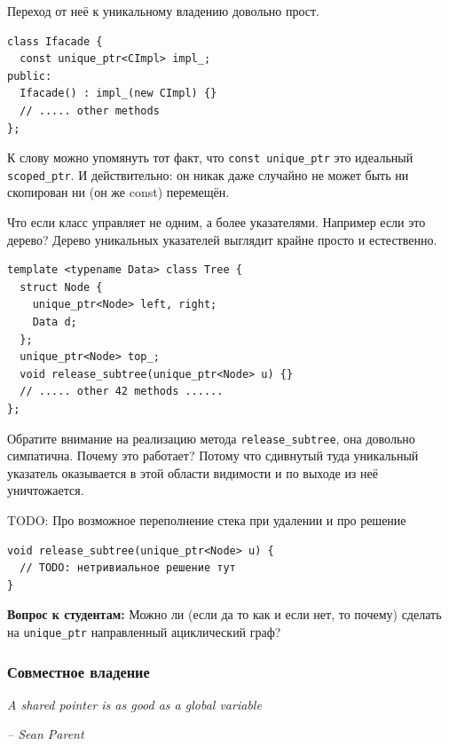 \documentclass[a4paper,12pt,oneside]{article}
\newif\ifanswers
\begin{document}
\ifanswers
Правильный ответ: например чтобы не забыть его инициализировать и чтобы заблокировать всякие копирующие и прочие конструкторы по умолчанию
\fi

Переход от неё к уникальному владению довольно прост.

\begin{lstlisting}
class Ifacade {
  const unique_ptr<CImpl> impl_;
public:
  Ifacade() : impl_(new CImpl) {}
  // ..... other methods
};
\end{lstlisting}

К слову можно упомянуть тот факт, что \lstinline!const unique_ptr! это идеальный \lstinline!scoped_ptr!. И действительно: он никак даже случайно не может быть ни скопирован ни (он же const) перемещён.

Что если класс управляет не одним, а более указателями. Например если это дерево? Дерево уникальных указателей выглядит крайне просто и естественно.

\begin{lstlisting}
template <typename Data> class Tree {
  struct Node {
    unique_ptr<Node> left, right;
    Data d;
  };
  unique_ptr<Node> top_;
  void release_subtree(unique_ptr<Node> u) {}
  // ..... other 42 methods ......
};
\end{lstlisting}

Обратите внимание на реализацию метода \lstinline!release_subtree!, она довольно симпатична. Почему это работает? Потому что сдивнутый туда уникальный указатель оказывается в этой области видимости и по выходе из неё уничтожается.

TODO: Про возможное переполнение стека при удалении и про решение

\begin{lstlisting}
void release_subtree(unique_ptr<Node> u) {
  // TODO: нетривиальное решение тут
}  
\end{lstlisting}

\textbf{Вопрос к студентам:} Можно ли (если да то как и если нет, то почему) сделать на \lstinline!unique_ptr! направленный ациклический граф?

\subsubsection{Совместное владение}\label{subsub:sharedptrs}

\hfill\textit{A shared pointer is as good as a global variable} {\vspace{0.5em}}

\hfill\textit{-- Sean Parent}
\end{document}
